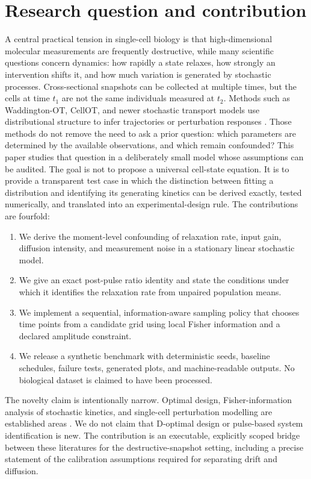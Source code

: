 \documentclass[11pt,a4paper]{article}
\begin{document}
\section{Research question and contribution}
A central practical tension in single-cell biology is that high-dimensional molecular measurements are frequently destructive, while many scientific questions concern dynamics: how rapidly a state relaxes, how strongly an intervention shifts it, and how much variation is generated by stochastic processes. Cross-sectional snapshots can be collected at multiple times, but the cells at time $t_1$ are not the same individuals measured at $t_2$. Methods such as Waddington-OT, CellOT, and newer stochastic transport models use distributional structure to infer trajectories or perturbation responses \citep{schiebinger2019,bunne2023,liu2026}. Those methods do not remove the need to ask a prior question: which parameters are determined by the available observations, and which remain confounded?
This paper studies that question in a deliberately small model whose assumptions can be audited. The goal is not to propose a universal cell-state equation. It is to provide a transparent test case in which the distinction between fitting a distribution and identifying its generating kinetics can be derived exactly, tested numerically, and translated into an experimental-design rule.
The contributions are fourfold:
\begin{enumerate}
\item We derive the moment-level confounding of relaxation rate, input gain, diffusion intensity, and measurement noise in a stationary linear stochastic model.
\item We give an exact post-pulse ratio identity and state the conditions under which it identifies the relaxation rate from unpaired population means.
\item We implement a sequential, information-aware sampling policy that chooses time points from a candidate grid using local Fisher information and a declared amplitude constraint.
\item We release a synthetic benchmark with deterministic seeds, baseline schedules, failure tests, generated plots, and machine-readable outputs. No biological dataset is claimed to have been processed.
\end{enumerate}
The novelty claim is intentionally narrow. Optimal design, Fisher-information analysis of stochastic kinetics, and single-cell perturbation modelling are established areas \citep{komorowski2011,fox2020,iolov2017,bunne2023}. We do not claim that D-optimal design or pulse-based system identification is new. The contribution is an executable, explicitly scoped bridge between these literatures for the destructive-snapshot setting, including a precise statement of the calibration assumptions required for separating drift and diffusion.
\end{document}
